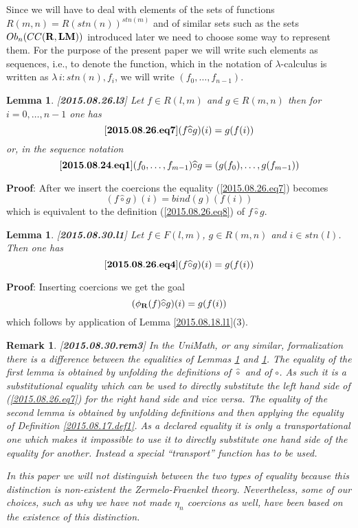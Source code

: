 \documentclass[11pt]{article}
\newenvironment{eq}{\begin{equation}}{\end{equation}}
\newenvironment{proof}{{\bf Proof}:}{\vskip 5mm }
\newtheorem{lemma}[proposition]{Lemma}
\newtheorem{remark}[proposition]{Remark}
\newcommand{\llabel}[1]{\label{#1}[{\bf #1}]}
\newcommand{\rr}{{\bf R}}
\newcommand{\lm}{{\bf LM}}
\newcommand{\wh}{\widehat}
\newcommand{\bind}{bind}
\newcommand{\hc}{\wh{\circ}}
\begin{document}
Since we will have to deal with elements of the sets of functions $R(m,n)=R(stn(n))^{stn(m)}$ and of similar sets such as the sets $Ob_n(CC(\rr,\lm))$ introduced later we need to choose some way to represent them. For the purpose of the present paper we will write such elements as sequences, i.e., to denote the function, which in the notation of $\lambda$-calculus is written as $\lambda\,i:stn(n), f_i$, we will write $(f_0,\dots,f_{n-1})$.
%
\begin{lemma}
\llabel{2015.08.26.l3}
Let $f\in R(l,m)$ and $g\in R(m,n)$ then for $i=0,\dots,n-1$ one has
%
\begin{eq}\llabel{2015.08.26.eq7}
(f\hc g)(i)=g(f(i))
\end{eq}
%
or, in the sequence notation
%
\begin{eq}\llabel{2015.08.24.eq1}
(f_0,\dots,f_{m-1})\hc g=(g(f_0),\dots,g(f_{m-1}))
\end{eq}
%
\end{lemma}
%
\begin{proof}
After we insert the coercions the equality (\ref{2015.08.26.eq7}) becomes
%
$$(f\hc g)(i)=\bind(g)(f(i))$$
%
which is equivalent to the definition (\ref{2015.08.26.eq8}) of $f\hc g$.
\end{proof}
% 
\begin{lemma}
\llabel{2015.08.30.l1}
Let $f\in F(l,m)$, $g\in R(m,n)$ and $i\in stn(l)$. Then one has
%
\begin{eq}\llabel{2015.08.26.eq4}
(f\hc g)(i)=g(f(i))
\end{eq}
% 
\end{lemma}
%
\begin{proof}
Inserting coercions we get the goal
%
$$(\phi_{\rr}(f)\hc g)(i)=g(f(i))$$
%
which follows by application of Lemma \ref{2015.08.18.l1}(3).
\end{proof}
%
\begin{remark}\rm
\llabel{2015.08.30.rem3}
In the UniMath, or any similar, formalization there is a difference between the equalities of Lemmas \ref{2015.08.26.l3} and \ref{2015.08.30.l1}. The equality of the first lemma is obtained by unfolding the definitions of $\hc$ and of $\circ$. As such it is a substitutional equality which can be used to directly substitute the left hand side of (\ref{2015.08.26.eq7}) for the right hand side and vice versa. The equality of the second lemma is obtained by unfolding definitions and then applying the equality of Definition \ref{2015.08.17.def1}. As a declared equality it is only a transportational one which makes it impossible to use it to directly substitute one hand side of the equality for another. Instead a special ``transport'' function has to be used. 

In this paper we will not distinguish between the two types of equality because this distinction is non-existent the Zermelo-Fraenkel theory. Nevertheless, some of our choices, such as why we have not made $\eta_n$ coercions as well, have been based on the existence of this distinction. 
\end{remark}
%
\end{document}
